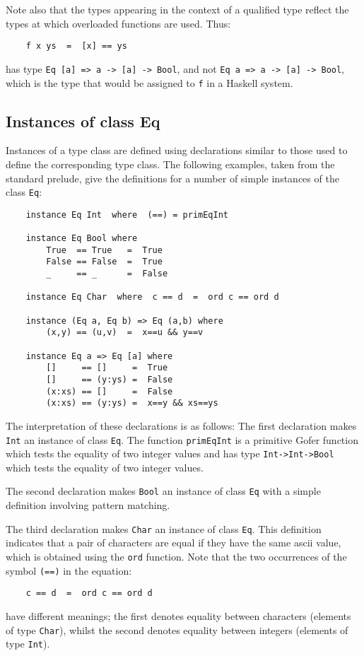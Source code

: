 Note also that the types appearing in the context of a  qualified  type
reflect the types at which overloaded functions are used.  Thus:
\begin{verbatim}
    f x ys  =  [x] == ys
\end{verbatim}
has type  \verb"Eq [a] => a -> [a] -> Bool", 
and not \verb"Eq a => a -> [a] -> Bool",
which is the type that would be assigned to \verb"f" in a Haskell system.


\subsection{Instances of class Eq}
Instances of a type class are defined  using  declarations  similar  to
those used to define  the  corresponding  type  class.   The  following
examples, taken from the standard prelude, give the definitions  for  a
number of simple instances of the class \verb"Eq":
\begin{verbatim}
    instance Eq Int  where  (==) = primEqInt

    instance Eq Bool where
        True  == True   =  True
        False == False  =  True
        _     == _      =  False

    instance Eq Char  where  c == d  =  ord c == ord d

    instance (Eq a, Eq b) => Eq (a,b) where
        (x,y) == (u,v)  =  x==u && y==v

    instance Eq a => Eq [a] where
        []     == []     =  True
        []     == (y:ys) =  False
        (x:xs) == []     =  False
        (x:xs) == (y:ys) =  x==y && xs==ys
\end{verbatim}
The interpretation of these declarations is as follows:
\BI
\IT  The first declaration  makes \verb"Int" an instance  of  
     class  \verb"Eq".   The
     function \verb"primEqInt" is a primitive Gofer function which tests the
     equality of two integer values and has type \verb"Int->Int->Bool"
     which tests the equality of two integer values.

\IT  The second declaration makes  \verb"Bool" an 
     instance of  class \verb"Eq" with a
     simple definition involving pattern matching.

\IT  The third declaration makes \verb"Char" 
     an instance of  class  \verb"Eq".   This
     definition indicates that a pair of characters are equal  if  they
     have the same {\sc ascii} value,  
     which  is  obtained  using  the  \verb"ord"
     function.  Note that the two occurrences of the symbol \verb"(==)" in the
     equation:
\begin{verbatim}
    c == d  =  ord c == ord d
\end{verbatim}
     have  different  meanings;  the  first  denotes  equality  between
     characters (elements of type  \verb"Char"),  whilst  the  second  denotes
     equality between integers (elements of type \verb"Int").

